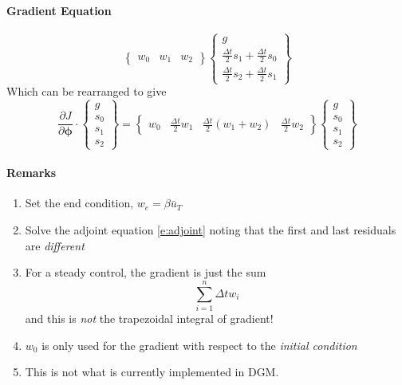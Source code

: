 \documentclass[10pt, oneside]{article}
\newcommand{\dgm}{\textsf{DGM}\xspace}
\newcommand{\bphi}{\boldsymbol{\phi}}
\begin{document}
\paragraph{Gradient Equation}
\[
\begin{Bmatrix}
w_0 & w_1 & w_2 
\end{Bmatrix}
\begin{Bmatrix}
g \\ \frac{\Delta t}{2} s_1 + \frac{\Delta t}{2} s_0  \\[0.5ex] \frac{\Delta t}{2} s_2 + \frac{\Delta t}{2} s_1
\end{Bmatrix}
\]
Which can be rearranged to give
\begin{equation} \label{e:gradient}
\frac{\partial J}{\partial\bphi} \cdot \begin{Bmatrix}
g \\ s_0 \\ s_1 \\ s_2 
\end{Bmatrix} =  
\begin{Bmatrix}
w_0 & \frac{\Delta t}{2}w_1 & \frac{\Delta t}{2}(w_1 + w_2) &  \frac{\Delta t}{2}w_2
\end{Bmatrix}
\begin{Bmatrix}
g \\ s_0 \\ s_1 \\ s_2 
\end{Bmatrix}
\end{equation}
%
\paragraph{Remarks}
\begin{enumerate}
\item Set the end condition, $w_e = \beta \bar u_T$
\item Solve the adjoint equation \eqref{e:adjoint} noting that the first and last residuals are \emph{different}
\item For a steady control, the gradient is just the sum
\[ \sum_{i=1}^n \Delta t w_i \]
and this is \emph{not} the trapezoidal integral of gradient!
\item $w_0$ is only used for the gradient with respect to the \emph{initial condition}
\item This is not what is currently implemented in \dgm.
\end{enumerate}
\end{document}
